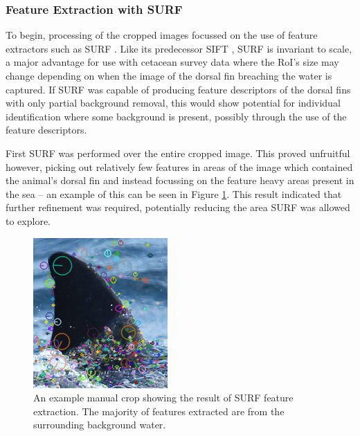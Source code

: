 \subsubsection{Feature Extraction with SURF}\label{ch:cetDet,sec:deciding,sub:boundingBoxInvestigation,subsub:SURF}

To begin, processing of the cropped images focussed on the use of feature extractors such as SURF \cite{bay_speeded-up_2008}. Like its predecessor SIFT \cite{lowe_object_1999}, SURF is invariant to scale, a major advantage for use with cetacean survey data where the RoI's size may change depending on when the image of the dorsal fin breaching the water is captured. If SURF was capable of producing feature descriptors of the dorsal fins with only partial background removal, this would show potential for individual identification where some background is present, possibly through the use of the feature descriptors.

First SURF was performed over the entire cropped image. This proved unfruitful however, picking out relatively few features in areas of the image which contained the animal's dorsal fin and instead focussing on the feature heavy areas present in the sea -- an example of this can be seen in Figure \ref{fig:manual-crop-surf-example}. This result indicated that further refinement was required, potentially reducing the area SURF was allowed to explore.

\begin{figure}
	\begin{center}
		\includegraphics[scale=0.6]{Chapter3/figs/manual-crop-surf.png}
	\end{center}
	\caption[An example manual crop showing the result of SURF feature extraction.]{An example manual crop showing the result of SURF feature extraction. The majority of features extracted are from the surrounding background water.
	}
	\label{fig:manual-crop-surf-example}
\end{figure}

